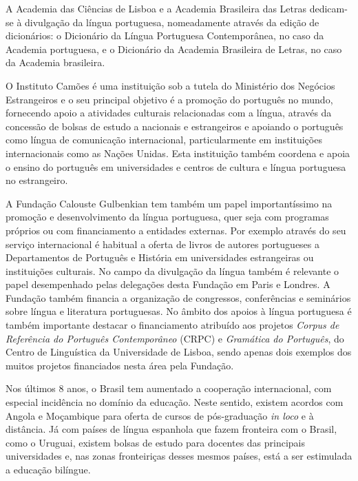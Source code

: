 \documentclass[]{../metanetpaper}
\begin{document}
\begin{multicols}{2}
 A Academia das Ciências de Lisboa e a Academia Brasileira das Letras dedicam-se à divulgação da língua portuguesa, nomeadamente através da edição de dicionários: o Dicionário da Língua Portuguesa Contemporânea, no caso da Academia portuguesa, e o Dicionário da Academia Brasileira de Letras, no caso da Academia brasileira. 

O Instituto Camões é uma instituição sob a tutela do Ministério dos Negócios Estrangeiros e o seu principal objetivo é a promoção do português no mundo, fornecendo apoio a atividades culturais relacionadas com a língua, através da concessão de bolsas de estudo a nacionais e estrangeiros e apoiando o português como língua de comunicação internacional, particularmente em instituições internacionais como as Nações Unidas. Esta instituição também coordena e apoia o ensino do português em universidades e centros de cultura e língua portuguesa no estrangeiro.


A Fundação Calouste Gulbenkian\cite{gulbenkian} tem também um papel importantíssimo na promoção e desenvolvimento da língua portuguesa, quer seja com programas próprios ou com financiamento a entidades externas. Por exemplo através do seu serviço internacional é habitual a oferta de livros de autores portugueses a Departamentos de Português e História em universidades estrangeiras ou instituições culturais. No campo da divulgação da língua também é relevante o papel desempenhado pelas delegações desta Fundação em Paris e Londres. A Fundação também financia a organização de congressos, conferências e seminários sobre língua e literatura portuguesas. No âmbito dos apoios à língua portuguesa é também importante destacar o financiamento atribuído aos projetos \textit{Corpus de Referência do Português Contemporâneo} (CRPC) e \textit{Gramática do Português}, do Centro de Linguística da Universidade de Lisboa, sendo apenas dois exemplos dos muitos projetos financiados nesta área pela Fundação.

Nos últimos 8 anos, o Brasil tem aumentado a cooperação internacional, com especial incidência no domínio da educação. Neste sentido, existem acordos com Angola e Moçambique para oferta de cursos de pós-graduação \textit{in loco} e à distância. Já com países de língua espanhola que fazem fronteira com o Brasil, como o Uruguai, existem bolsas de estudo para docentes das principais universidades e, nas zonas fronteiriças desses mesmos países, está a ser estimulada a educação bilíngue.


\end{multicols}
\end{document}
